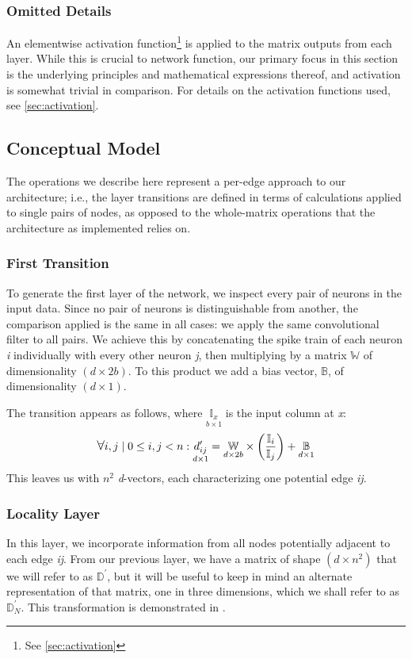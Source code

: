 \subsubsection{Omitted Details}
An elementwise activation function\footnote{See \ref{sec:activation}} is applied 
to the matrix outputs from each layer. While this is crucial to network 
function, our primary focus in this section is the underlying principles and 
mathematical expressions thereof, and activation is somewhat trivial in 
comparison. For details on the activation functions used, see 
\ref{sec:activation}.

\subsection{Conceptual Model}
\label{subsec:conceptualmodel}
The operations we describe here represent a per-edge approach to our 
architecture; i.e., the layer transitions are defined in terms of calculations 
applied to single pairs of nodes, as opposed to the whole-matrix operations that 
the architecture as implemented relies on.

\subsubsection{First Transition}
To generate the first layer of the network, we inspect every pair of neurons in 
the input data. Since no pair of neurons is distinguishable from another, the 
comparison applied is the same in all cases: we apply the same convolutional 
filter to all pairs. We achieve this by concatenating the spike train of each 
neuron \textit{i} individually with every other neuron \textit{j}, then 
multiplying by a matrix $\mathbb{W}$ of dimensionality $(d \times 2b)$. To this 
product we add a bias vector, $\mathbb{B}$, of dimensionality $(d \times 1)$.

The transition appears as follows, where $\underset{b \times 1}{\mathbb{I}_x}$ 
is the input column at \textit{x}:
\[
	\mathlarger\forall i,j \mid 0 \leq i,j < n: \underset{d \times 
	1}{d_{ij}^\prime} = \underset{d \times 2b}{\mathbb{W}} \times 
	\left(\frac{\mathbb{I}_i}{\mathbb{I}_j}\right) + \underset{d \times 
	1}{\mathbb{B}}
\]
This leaves us with $n^2$ \textit{d}-vectors, each characterizing one potential 
edge \textit{ij}.

\subsubsection{Locality Layer}
\label{subsubsec:locality}
In this layer, we incorporate information from all nodes potentially adjacent to 
each edge \textit{ij}. From our previous layer, we have a matrix of shape $(d 
\times n^2)$ that we will refer to as $\mathbb{D}^{\prime}$, but it will be 
useful to keep in mind an alternate representation of that matrix, one in three 
dimensions, which we shall refer to as $\mathbb{D}_N^{\prime}$. This 
transformation is demonstrated in .

